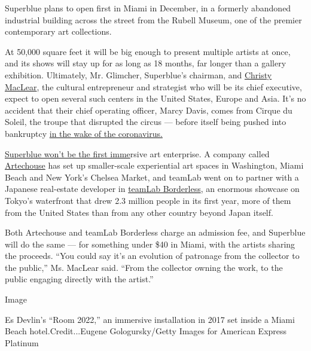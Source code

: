 Superblue plans to open first in Miami in December, in a formerly
abandoned industrial building across the street from the Rubell Museum,
one of the premier contemporary art collections.

At 50,000 square feet it will be big enough to present multiple artists
at once, and its shows will stay up for as long as 18 months, far longer
than a gallery exhibition. Ultimately, Mr. Glimcher, Superblue's
chairman, and \href{https://www.youtube.com/watch?v=_aC5tn6jKzk}{Christy
MacLear}, the cultural entrepreneur and strategist who will be its chief
executive, expect to open several such centers in the United States,
Europe and Asia. It's no accident that their chief operating officer,
Marcy Davis, comes from Cirque du Soleil, the troupe that disrupted the
circus --- before itself being pushed into bankruptcy
\href{https://www.nytimes.com/2020/05/17/world/canada/cirque-du-soleil-coronavirus-debt.html}{in
the wake of the coronavirus.}

\href{https://www.nytimes.com/2020/05/17/world/canada/cirque-du-soleil-coronavirus-debt.html}{Superblue
won't be the first imme}rsive art enterprise. A company called
\href{https://www.nytimes.com/2018/03/14/arts/artechouse-washington-dc-museum.html}{Artechouse}
has set up smaller-scale experiential art spaces in Washington, Miami
Beach and New York's Chelsea Market, and teamLab went on to partner with
a Japanese real-estate developer in
\href{https://borderless.teamlab.art/}{teamLab Borderless}, an enormous
showcase on Tokyo's waterfront that drew 2.3 million people in its first
year, more of them from the United States than from any other country
beyond Japan itself.

Both Artechouse and teamLab Borderless charge an admission fee, and
Superblue will do the same --- for something under \$40 in Miami, with
the artists sharing the proceeds. ``You could say it's an evolution of
patronage from the collector to the public,'' Ms. MacLear said. ``From
the collector owning the work, to the public engaging directly with the
artist.''

Image

Es Devlin's ``Room 2022,'' an immersive installation in 2017 set inside
a Miami Beach hotel.Credit...Eugene Gologursky/Getty Images for American
Express Platinum

